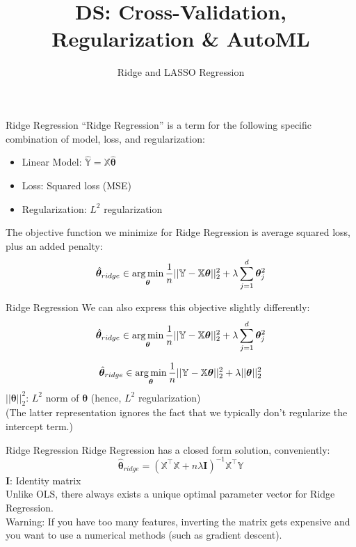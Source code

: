 \documentclass[aspectratio=169]{../latex_main/tntbeamer}  %
\title[CV, Reg \& AutoML]{DS: Cross-Validation, Regularization \& AutoML}
\subtitle{Ridge and LASSO Regression}
\begin{document}
	
	\maketitle
	\begin{frame}{Ridge Regression}
	    “Ridge Regression” is a term for the following specific combination of model, loss, and regularization:
	    \begin{itemize}
	        \item Linear Model: $\mathbb{\hat{Y}} = \mathbb{X}\hat{\bm\theta}$
	        \item Loss: Squared loss (MSE)
	        \item Regularization: $L^2$ regularization
	    \end{itemize}
	    The objective function we minimize for Ridge Regression is average squared loss, plus an added penalty:
	    \begin{equation*}
	        \hat{\bm{\theta}}_{ridge} \in \operatorname*{arg\,min}_{\bm\theta}\frac{1}{n}||\mathbb{Y} - \mathbb{X}\bm{\theta}||_2^2 + \lambda \sum_{j=1}^d\bm{\theta}_j^2 
	    \end{equation*}
	\end{frame}
	
	
	\begin{frame}{Ridge Regression}
	    We can also express this objective slightly differently:
	    \begin{equation*}
	        \hat{\bm{\theta}}_{ridge} \in \operatorname*{arg\,min}_{\bm\theta}\frac{1}{n}||\mathbb{Y} - \mathbb{X}\bm{\theta}||_2^2 + \lambda \sum_{j=1}^d\bm{\theta}_j^2 
	    \end{equation*}
	    
	    \begin{equation*}
	    	        \hat{\bm{\theta}}_{ridge} \in \argmin_{\bm\theta}\frac{1}{n}||\mathbb{Y} - \mathbb{X}\bm{\theta}||_2^2 + \lambda ||\bm{\theta}||^2_2 
	        
	    \end{equation*}
	    $||\bm{\theta} ||^2_2$: $L^2$ norm of $\bm\theta$ (hence, $L^2$ regularization)\\
	    \bigskip
	    (The latter representation ignores the fact that we typically don’t regularize the intercept term.)
	\end{frame}
	
	
	\begin{frame}[c]{Ridge Regression}
	    Ridge Regression has a closed form solution, conveniently:
	    \begin{equation*}
	        \hat{\bm\theta}_{ridge} = (\mathbb{X}^\intercal\mathbb{X} + n\lambda \bm{I})^{-1} \mathbb{X}^\intercal\mathbb{Y}
	    \end{equation*}
	   $\bm{I}$: Identity matrix\\[1em]
	    Unlike OLS, there always exists a unique optimal parameter vector for Ridge Regression.\\[1em]
	    
	    \alert{Warning}: If you have too many features, inverting the matrix gets expensive and you want to use a numerical methods (such as gradient descent).

	\end{frame}
	
\end{document}
